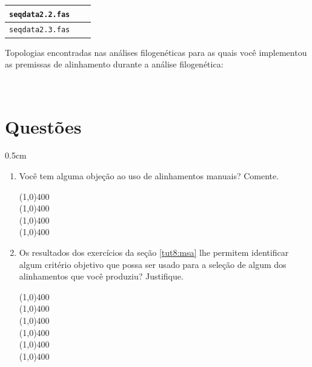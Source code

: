 \begin{refsection}
\begin{center}
\begin{longtable}{|c|c|c|}
\hline \texttt{seqdata2.2.fas} &  & \\
\hline \texttt{seqdata2.3.fas} &  & \\

\end{longtable}
\end{center}


Topologias encontradas nas análises filogenéticas para as quais você implementou as premissas de alinhamento durante a análise filogenética:

\begin{center}
\\
\end{center}



\newpage
\section{Questões}\label{tut8:quiz}

\begin {myindentpar}{0.5cm}
\begin{enumerate}[\itshape 1.]

	\item{Você tem alguma objeção ao uso de alinhamentos manuais? Comente.}

\line(1,0){400}\\
\line(1,0){400}\\
\line(1,0){400}\\
\line(1,0){400}\\

	\item{Os resultados dos exercícios da seção \ref{tut8:msa} lhe permitem identificar algum critério objetivo que possa ser usado para a seleção de algum dos alinhamentos que você produziu? Justifique.}

\line(1,0){400}\\
\line(1,0){400}\\
\line(1,0){400}\\
\line(1,0){400}\\
\line(1,0){400}\\
\line(1,0){400}\\



\end{enumerate}
\end{myindentpar}
\end{refsection}
